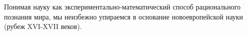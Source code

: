 Понимая науку как экспериментально-математический способ рационального познания мира, 
мы неизбежно упираемся в основание новоевропейской науки (рубеж XVI-XVII веков). 


